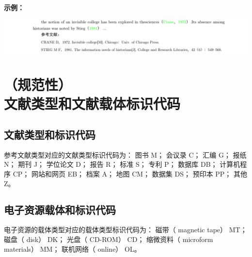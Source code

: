 \documentclass[twoside]{article}%
\begin{document}
\textbf{示例：}

\noindent\hspace{-2.5cm}\includegraphics[width=\paperwidth,page=5]{tngbcitationaynew.pdf}
%
%
%

\newpage
\section[文献类型和文献载体标识代码]{（规范性）\\文献类型和文献载体标识代码}

\subsection{文献类型和标识代码}

参考文献类型对应的文献类型标识代码为：
图书 M；
会议录 C；
汇编 G；
报纸 N；
期刊 J；
学位论文 D；
报告 R；
标准 S；
专利 P；
数据库 DB；
计算机程序 CP；
网站和网页 EB；
档案 A；
地图 CM；
数据集 DS；
预印本 PP；
其他 Z。

\subsection{电子资源载体和标识代码}


电子资源的载体类型对应的载体类型标识代码为：
磁带（ magnetic tape） MT；
磁盘（ disk） DK；
光盘（ CD-ROM） CD；
缩微资料（ microform materials） MM；
联机网络（ online） OL。
\end{document}
